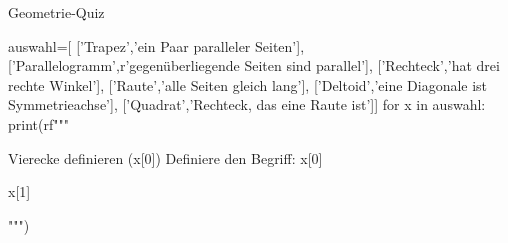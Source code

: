 \documentclass[ngerman,a4paper,10pt]{article}
\begin{document}
\begin{quiz}{Geometrie-Quiz}
\begin{python}
auswahl=[
  ['Trapez','ein Paar paralleler Seiten'],
  ['Parallelogramm',r'gegen\"uberliegende Seiten sind parallel'],
  ['Rechteck','hat drei rechte Winkel'],
  ['Raute','alle Seiten gleich lang'],
  ['Deltoid','eine Diagonale ist Symmetrieachse'],
  ['Quadrat','Rechteck, das eine Raute ist']]
for x in auswahl:
  print(rf"""\begin{{essay}}[points=2, response format=html]{{Vierecke definieren ({x[0]})}}
  Definiere den Begriff: {x[0]}
  \item {x[1]}
  \end{{essay}}""")
\end{python}	
\end{quiz}
\end{document}
